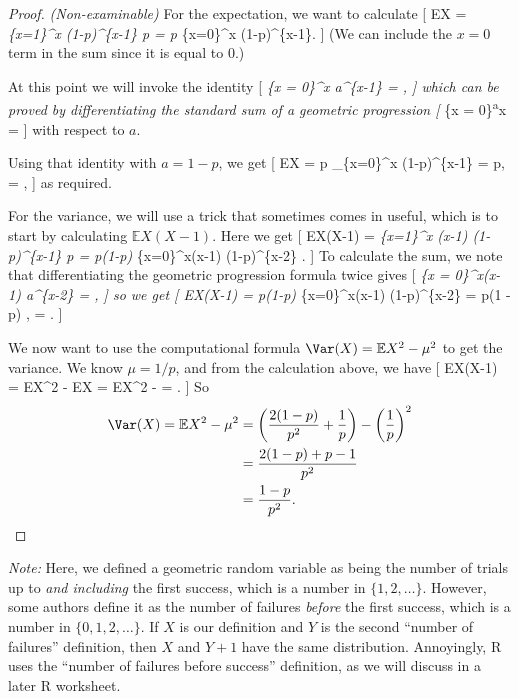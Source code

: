 \documentclass[
  letterpaper,
  DIV=11,
  numbers=noendperiod]{scrreprt}
\theoremstyle{remark}
\begin{document}
\begin{proof}

\emph{(Non-examinable)} For the expectation, we want to calculate {[}
\mathbb EX = \sum\emph{\{x=1\}\^{}\infty x (1-p)\^{}\{x-1\} p = p
\sum}\{x=0\}\^{}\infty x (1-p)\^{}\{x-1\}. {]} (We can include the
\(x = 0\) term in the sum since it is equal to 0.)

At this point we will invoke the identity {[} \sum\emph{\{x =
0\}\^{}\infty x a\^{}\{x-1\} =  , {]} which can be
proved by differentiating the standard sum of a geometric progression
{[} \sum}\{x = 0\}\textsuperscript{\infty a}x =  {]} with
respect to \(a\).

Using that identity with \(a = 1-p\), we get {[} \mathbb EX = p
\sum\_\{x=0\}\^{}\infty x (1-p)\^{}\{x-1\} = p,
 =  , {]} as required.

For the variance, we will use a trick that sometimes comes in useful,
which is to start by calculating \(\mathbb EX(X-1)\). Here we get {[}
\mathbb EX(X-1) = \sum\emph{\{x=1\}\^{}\infty x (x-1) (1-p)\^{}\{x-1\} p
= p(1-p) \sum}\{x=0\}\^{}\infty x(x-1) (1-p)\^{}\{x-2\} . {]} To
calculate the sum, we note that differentiating the geometric
progression formula twice gives {[} \sum\emph{\{x = 0\}\^{}\infty x(x-1)
a\^{}\{x-2\} =  , {]} so we get {[} \mathbb EX(X-1) =
p(1-p) \sum}\{x=0\}\^{}\infty x(x-1) (1-p)\^{}\{x-2\} = p(1 -p) ,
 =  . {]}

We now want to use the computational formula
\(\Var(X) = \mathbb EX^2 - \mu^2\) to get the variance. We know
\(\mu = 1/p\), and from the calculation above, we have {[}
\mathbb EX(X-1) = \mathbb EX\^{}2 - \mathbb EX = \mathbb EX\^{}2 -
 =  . {]} So \begin{align*}
\Var(X) = \mathbb EX^2 - \mu^2
&= \left(\frac{2(1-p)}{p^2} + \frac{1}{p}\right) - \left(\frac{1}{p}\right)^2 \\
&= \frac{2(1-p) + p - 1}{p^2} \\
&= \frac{1-p}{p^2} .
\end{align*}

\end{proof}

\emph{Note:} Here, we defined a geometric random variable as being the
number of trials up to \emph{and including} the first success, which is
a number in \(\{1, 2, \dots\}\). However, some authors define it as the
number of failures \emph{before} the first success, which is a number in
\(\{0, 1, 2,\dots\}\). If \(X\) is our definition and \(Y\) is the
second ``number of failures'' definition, then \(X\) and \(Y+1\) have
the same distribution. Annoyingly, R uses the ``number of failures
before success'' definition, as we will discuss in a later R worksheet.
\end{document}
